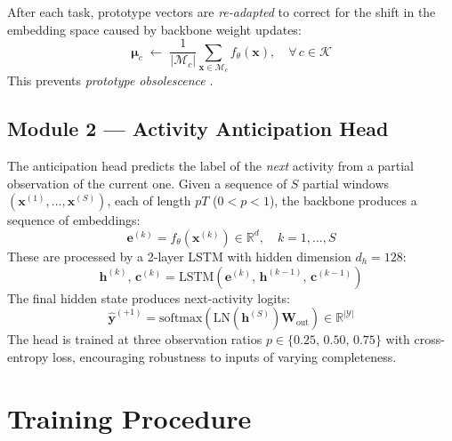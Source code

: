 After each task, prototype vectors are \emph{re-adapted} to correct for
the shift in the embedding space caused by backbone weight updates:
\begin{equation}
    \boldsymbol{\mu}_c \;\leftarrow\;
    \frac{1}{|\mathcal{M}_c|}
    \sum_{\mathbf{x} \in \mathcal{M}_c} f_\theta(\mathbf{x}),
    \quad \forall\, c \in \mathcal{K}
    \label{eq:proto_adapt}
\end{equation}
This prevents \emph{prototype obsolescence} \cite{adaimi2022lifelong}.


\subsection{Module 2 --- Activity Anticipation Head}

The anticipation head predicts the label of the \emph{next} activity from
a partial observation of the current one. Given a sequence of $S$ partial
windows $(\mathbf{x}^{(1)}, \ldots, \mathbf{x}^{(S)})$, each of length
$pT$ ($0 < p < 1$), the backbone produces a sequence of embeddings:
\begin{equation}
    \mathbf{e}^{(k)} = f_\theta\!\left(\mathbf{x}^{(k)}\right)
    \in \mathbb{R}^{d}, \quad k = 1, \ldots, S
\end{equation}
These are processed by a 2-layer LSTM with hidden dimension $d_h = 128$:
\begin{equation}
    \mathbf{h}^{(k)},\, \mathbf{c}^{(k)} =
    \mathrm{LSTM}\!\left(\mathbf{e}^{(k)},\,
                         \mathbf{h}^{(k-1)},\,
                         \mathbf{c}^{(k-1)}\right)
\end{equation}
The final hidden state produces next-activity logits:
\begin{equation}
    \hat{\mathbf{y}}^{(+1)} =
    \mathrm{softmax}\!\left(
        \mathrm{LN}\!\left(\mathbf{h}^{(S)}\right)\mathbf{W}_{\mathrm{out}}
    \right) \in \mathbb{R}^{|\mathcal{Y}|}
    \label{eq:anticipation}
\end{equation}
The head is trained at three observation ratios $p \in \{0.25,\,0.50,\,0.75\}$
with cross-entropy loss, encouraging robustness to inputs of varying
completeness.


\section{Training Procedure}

